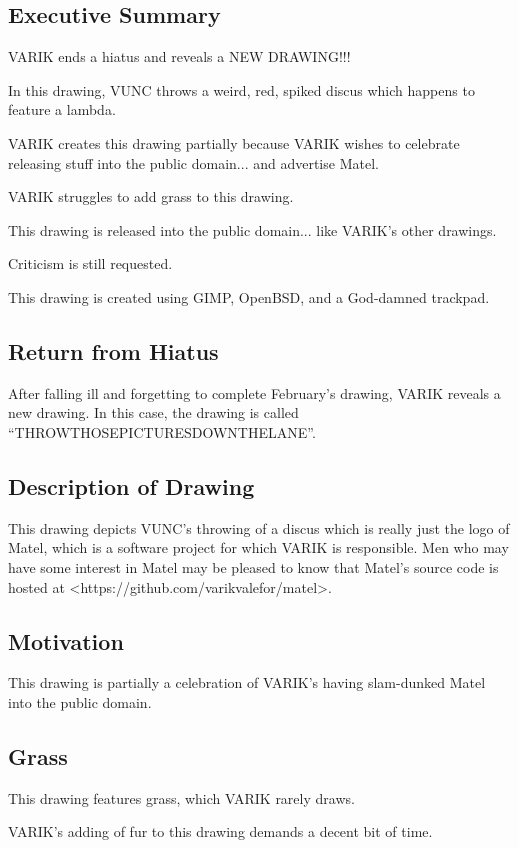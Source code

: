 \documentclass{report}
\begin{document}
\subsection{Executive Summary}
VARIK ends a hiatus and reveals a NEW DRAWING!!!

In this drawing, VUNC throws a weird, red, spiked discus which happens to feature a lambda.

VARIK creates this drawing partially because VARIK wishes to celebrate releasing stuff into the public domain... and advertise Matel.

VARIK struggles to add grass to this drawing.

This drawing is released into the public domain... like VARIK's other drawings.

Criticism is still requested.

This drawing is created using GIMP, OpenBSD, and a God-damned trackpad.

\subsection{Return from Hiatus}
After falling ill and forgetting to complete February's drawing, VARIK reveals a new drawing.  In this case, the drawing is called ``THROWTHOSEPICTURESDOWNTHELANE''.

\subsection{Description of Drawing}
This drawing depicts VUNC's throwing of a discus which is really just the logo of Matel, which is a software project for which VARIK is responsible.  Men who may have some interest in Matel may be pleased to know that Matel's source code is hosted at <https://github.com/varikvalefor/matel>.

\subsection{Motivation}
This drawing is partially a celebration of VARIK's having slam-dunked Matel into the public domain.

\subsection{Grass}
This drawing features grass, which VARIK rarely draws.

VARIK's adding of fur to this drawing demands a decent bit of time.
\end{document}
